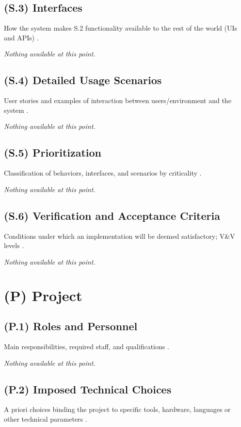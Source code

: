 \documentclass[12pt,letterpaper]{article}
\begin{document}
\subsection{(S.3) Interfaces}
How the system makes S.2 functionality available to the rest of the world (UIs and APIs) \cite{meyer2022}.

\textit{Nothing available at this point.}

\subsection{(S.4) Detailed Usage Scenarios}
User stories and examples of interaction between users/environment and the system \cite{meyer2022}.

\textit{Nothing available at this point.}

\subsection{(S.5) Prioritization}
Classification of behaviors, interfaces, and scenarios by criticality \cite{meyer2022}.

\textit{Nothing available at this point.}

\subsection{(S.6) Verification and Acceptance Criteria}
Conditions under which an implementation will be deemed satisfactory; V\&V levels \cite{meyer2022}.

\textit{Nothing available at this point.}

\clearpage

\section{(P) Project}

\subsection{(P.1) Roles and Personnel}
Main responsibilities, required staff, and qualifications \cite{meyer2022}.

\textit{Nothing available at this point.}

\subsection{(P.2) Imposed Technical Choices}
A priori choices binding the project to specific tools, hardware, languages or other technical parameters \cite{meyer2022}.
\end{document}
